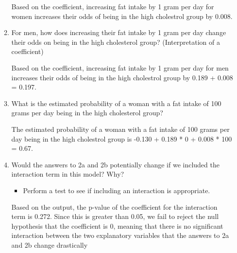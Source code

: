 \documentclass[12pt,letterpaper]{article}
\begin{document}
\begin{enumerate}
\begin{enumerate}
		
		Based on the coefficient, increasing fat intake by 1 gram per day for women increases their odds of being in the high cholestrol group by 0.008.
		\item
		
		For men, how does increasing their fat intake by 1 gram per day change their odds on being in the high cholesterol group? (Interpretation of a coefficient)
		
		
		Based on the coefficient, increasing fat intake by 1 gram per day for men increases their odds of being in the high cholestrol group by 0.189 + 0.008 = 0.197. 
				
		\item
		
		What is the estimated probability of a woman with a fat intake of 100 grams per day being in the high cholesterol group? 
		
		The estimated probability of a woman with a fat intake of 100 grams per day being in the high cholestrol group is -0.130 + 0.189 * 0 + 0.008 * 100 = 0.67.
		\item
		Would the answers to 2a and 2b potentially change if we included the interaction term in this model? Why? 
		\begin{itemize}
			\item Perform a test to see if including an interaction is appropriate.
		\end{itemize}
	
			  
			
		Based on the output, the p-value of the coefficient for the interaction term is 0.272. Since this is greater than 0.05, we fail to reject the null hypothesis that the coefficient is 0, meaning that there is no significant interaction between the two explanatory variables that the answers to 2a and 2b change drastically
	
		
	\end{enumerate}
\end{enumerate}
\newpage
\end{document}
